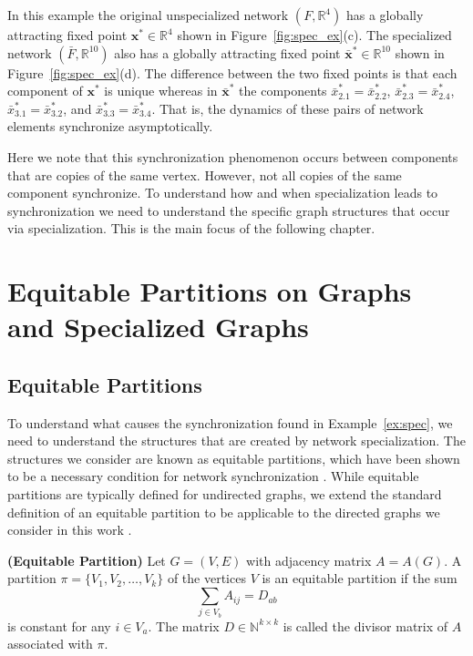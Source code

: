 \documentclass[12pt]{thesis}
\begin{document}
\begin{example}
In this example the original unspecialized network $(F,\mathbb{R}^4)$ has a globally attracting fixed point $\mathbf{x}^*\in\mathbb{R}^4$ shown in Figure~\ref{fig:spec_ex}(c).
The specialized network $(\bar{F},\mathbb{R}^{10})$ also has a globally attracting fixed point $\bar{\mathbf{x}}^*\in\mathbb{R}^{10}$ shown in Figure~\ref{fig:spec_ex}(d).
The difference between the two fixed points is that each component of $\mathbf{x}^*$ is unique whereas in $\bar{\mathbf{x}}^*$ the components $\bar{x}_{2.1}^*=\bar{x}_{2.2}^*$, $\bar{x}_{2.3}^*=\bar{x}_{2.4}^*$, $\bar{x}_{3.1}^*=\bar{x}_{3.2}^*$, and $\bar{x}_{3.3}^*=\bar{x}_{3.4}^*$.
That is, the dynamics of these pairs of network elements {synchronize asymptotically}.
\end{example}

Here we note that this synchronization phenomenon occurs between components that are copies of the same vertex.
However, not all copies of the same component synchronize.
To understand how and when specialization leads to synchronization we need to understand the specific graph structures that occur via specialization.
This is the main focus of the following chapter.


\chapter{Equitable Partitions on Graphs and Specialized Graphs}\label{chapt:eqp}

\section{Equitable Partitions}

To understand what causes the synchronization found in Example~\ref{ex:spec}, we need to understand the structures that are created by network specialization.
The structures we consider are known as equitable partitions, which have been shown to be a necessary condition for network synchronization \cite{11}.
While equitable partitions are typically defined for undirected graphs, we extend the standard definition of an equitable partition to be applicable to the directed graphs we consider in this work \cite{Godsil01}.

\begin{definition}\label{def:ep}\textbf{(Equitable Partition)}
Let $G=(V,E)$ with adjacency matrix $A=A(G)$.
A partition $\pi=\{V_1,V_2,\dots,V_k\}$ of the vertices $V$ is an equitable partition if the sum
\begin{equation}\label{eq:ep}
    \sum_{j\in V_b}A_{ij}=D_{ab}    
\end{equation}
is constant for any $i\in V_a$.
The matrix $D\in\mathbb{N}^{k\times k}$ is called the {divisor matrix} of $A$ associated with $\pi$. 
\end{definition}
\end{document}
